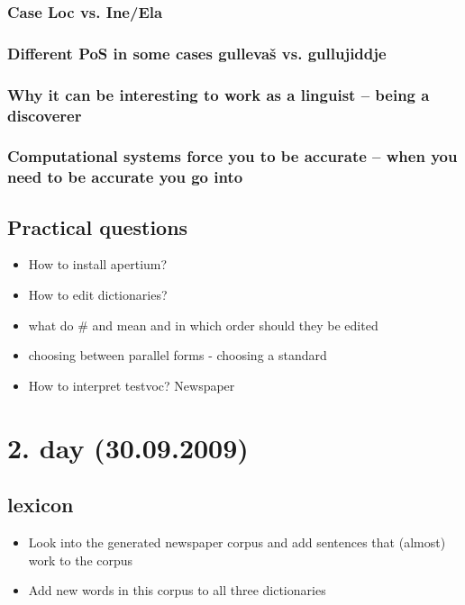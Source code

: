 \documentclass[a4paper,english,12pt]{article}
\begin{document}
\subsubsection{Case Loc vs. Ine/Ela}
\subsubsection{Different PoS in some cases gullevaš vs. gullujiddje}
\subsubsection{Why it can be interesting to work as a linguist -- being a discoverer}
\subsubsection{Computational systems force you to be accurate -- when you need to be accurate you go into} 



\subsection{Practical questions}

\begin{itemize}
\item How to install apertium?
\item    How to edit dictionaries?
\item what do \# \* \@ and \/ mean and in which order should they be edited
\item choosing between parallel forms - choosing a standard
\item    How to interpret testvoc? Newspaper
\end{itemize}


\section{2. day (30.09.2009)}
\subsection{lexicon}
\begin{itemize}
\item Look into the generated newspaper corpus and add sentences that (almost) work to the corpus
\item Add new words in this corpus to all three dictionaries
\end{itemize}
\end{document}
